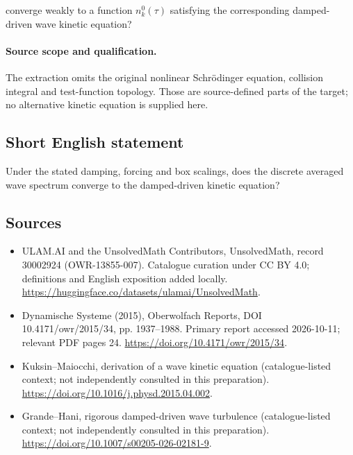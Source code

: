 \documentclass[11pt]{article}
\begin{document}
converge weakly to a function $n_k^0(\tau)$ satisfying the corresponding damped-driven wave kinetic equation?

\paragraph{Source scope and qualification.}
The extraction omits the original nonlinear Schrödinger equation, collision integral and test-function topology. Those are source-defined parts of the target; no alternative kinetic equation is supplied here.
\subsection{Short English statement}
Under the stated damping, forcing and box scalings, does the discrete averaged wave spectrum converge to the damped-driven kinetic equation?
\subsection{Sources}
\begin{itemize}
\item[\hypertarget{source:30002924:1}{S1}] ULAM.AI and the UnsolvedMath Contributors, UnsolvedMath, record 30002924 (OWR-13855-007). Catalogue curation under CC BY 4.0; definitions and English exposition added locally.
\url{https://huggingface.co/datasets/ulamai/UnsolvedMath}.
\item[\hypertarget{source:30002924:2}{S2}] Dynamische Systeme (2015), Oberwolfach Reports, DOI 10.4171/owr/2015/34, pp. 1937--1988. Primary report accessed 2026-10-11; relevant PDF pages 24.
\url{https://doi.org/10.4171/owr/2015/34}.
\item[\hypertarget{source:30002924:3}{S3}] Kuksin--Maiocchi, derivation of a wave kinetic equation (catalogue-listed context; not independently consulted in this preparation).
\url{https://doi.org/10.1016/j.physd.2015.04.002}.
\item[\hypertarget{source:30002924:4}{S4}] Grande--Hani, rigorous damped-driven wave turbulence (catalogue-listed context; not independently consulted in this preparation).
\url{https://doi.org/10.1007/s00205-026-02181-9}.
\end{itemize}
\label{end:30002924}
\end{document}

